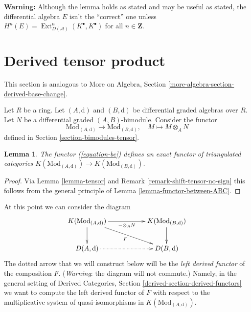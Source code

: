 \documentclass{stacks-project}
\theoremstyle{plain}
\newtheorem{lemma}[subsection]{Lemma}
\theoremstyle{definition}
\theoremstyle{remark}
\numberwithin{equation}{subsection}
\def\Ext{\mathop{\mathrm{Ext}}\nolimits}
\begin{document}
\noindent
{\bf Warning:} Although the lemma holds as stated and may be useful
as stated, the differential algebra $E$ isn't the ``correct'' one unless
$H^n(E) = \Ext^n_{D(\mathcal{A})}(K^\bullet, K^\bullet)$
for all $n \in \mathbf{Z}$.





\section{Derived tensor product}
\label{section-base-change}

\noindent
This section is analogous to More on Algebra, Section
\ref{more-algebra-section-derived-base-change}.

\medskip\noindent
Let $R$ be a ring. Let $(A, \text{d})$ and $(B, \text{d})$ be
differential graded algebras over $R$. Let $N$ be a
differential graded $(A, B)$-bimodule. Consider the functor
\begin{equation}
\label{equation-bc}
\text{Mod}_{(A, \text{d})}
\longrightarrow
\text{Mod}_{(B, \text{d})},\quad
M \longmapsto M \otimes_A N
\end{equation}
defined in Section \ref{section-bimodules-tensor}.

\begin{lemma}
\label{lemma-bc-homotopy}
The functor (\ref{equation-bc}) defines an exact functor
of triangulated categories
$K(\text{Mod}_{(A, \text{d})}) \to K(\text{Mod}_{(B, \text{d})})$.
\end{lemma}

\begin{proof}
Via Lemma \ref{lemma-tensor} and
Remark \ref{remark-shift-tensor-no-sign}
this follows from the general principle of
Lemma \ref{lemma-functor-between-ABC}.
\end{proof}

\noindent
At this point we can consider the diagram
$$
\xymatrix{
K(\text{Mod}_{(A, \text{d})}) \ar[d] \ar[rr]_{- \otimes_A N} \ar[rrd]_F & &
K(\text{Mod}_{(B, \text{d})}) \ar[d] \\
D(A, \text{d}) \ar@{..>}[rr] & &
D(B, \text{d})
}
$$
The dotted arrow that we will construct below will be the
{\it left derived functor} of the composition $F$.
({\it Warning}: the diagram will not commute.)
Namely, in the general setting of
Derived Categories, Section \ref{derived-section-derived-functors}
we want to compute the
left derived functor of $F$ with respect to the multiplicative system of
quasi-isomorphisms in $K(\text{Mod}_{(A, \text{d})})$.
\end{document}
